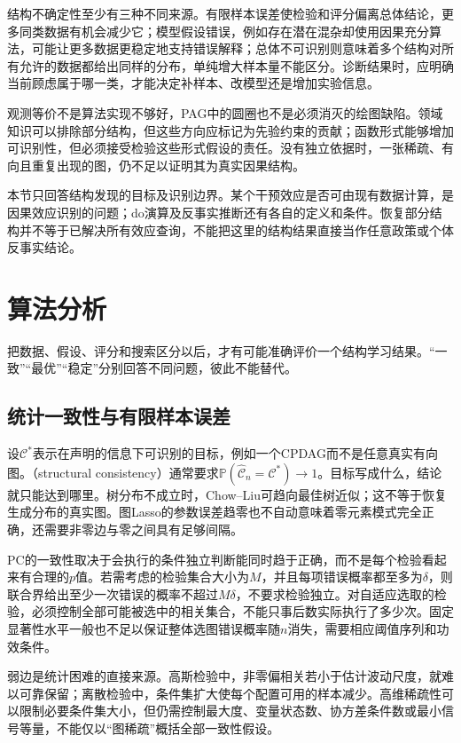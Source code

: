 结构不确定性至少有三种不同来源。有限样本误差使检验和评分偏离总体结论，更多同类数据有机会减少它；模型假设错误，例如存在潜在混杂却使用因果充分算法，可能让更多数据更稳定地支持错误解释；总体不可识别则意味着多个结构对所有允许的数据都给出同样的分布，单纯增大样本量不能区分。诊断结果时，应明确当前顾虑属于哪一类，才能决定补样本、改模型还是增加实验信息。

观测等价不是算法实现不够好，PAG中的圆圈也不是必须消灭的绘图缺陷。领域知识可以排除部分结构，但这些方向应标记为先验约束的贡献；函数形式能够增加可识别性，但必须接受检验这些形式假设的责任。没有独立依据时，一张稀疏、有向且重复出现的图，仍不足以证明其为真实因果结构。

本节只回答结构发现的目标及识别边界。某个干预效应是否可由现有数据计算，是因果效应识别的问题；do演算及反事实推断还有各自的定义和条件。恢复部分结构并不等于已解决所有效应查询，不能把这里的结构结果直接当作任意政策或个体反事实结论。

\section{算法分析}
\label{sec:pgm-structure-learning-analysis}

把数据、假设、评分和搜索区分以后，才有可能准确评价一个结构学习结果。“一致”“最优”“稳定”分别回答不同问题，彼此不能替代。

\subsection{统计一致性与有限样本误差}
\label{sec:pgm-structure-learning-consistency}

设$\mathcal{C}^{*}$表示在声明的信息下可识别的目标，例如一个CPDAG而不是任意真实有向图。（structural consistency）通常要求$\mathbb{P}(\widehat{\mathcal{C}}_n=\mathcal{C}^{*})\to1$。目标写成什么，结论就只能达到哪里。树分布不成立时，Chow--Liu可趋向最佳树近似；这不等于恢复生成分布的真实图。图Lasso的参数误差趋零也不自动意味着零元素模式完全正确，还需要非零边与零之间具有足够间隔。

PC的一致性取决于会执行的条件独立判断能同时趋于正确，而不是每个检验看起来有合理的$p$值。若需考虑的检验集合大小为$M$，并且每项错误概率都至多为$\delta$，则联合界给出至少一次错误的概率不超过$M\delta$，不要求检验独立。对自适应选取的检验，必须控制全部可能被选中的相关集合，不能只事后数实际执行了多少次。固定显著性水平一般也不足以保证整体选图错误概率随$n$消失，需要相应阈值序列和功效条件。

弱边是统计困难的直接来源。高斯检验中，非零偏相关若小于估计波动尺度，就难以可靠保留；离散检验中，条件集扩大使每个配置可用的样本减少。高维稀疏性可以限制必要条件集大小，但仍需控制最大度、变量状态数、协方差条件数或最小信号等量，不能仅以“图稀疏”概括全部一致性假设。

